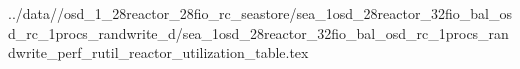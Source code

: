 ../data//osd_1_28reactor_28fio_rc_seastore/sea_1osd_28reactor_32fio_bal_osd_rc_1procs_randwrite_d/sea_1osd_28reactor_32fio_bal_osd_rc_1procs_randwrite_perf_rutil_reactor_utilization_table.tex